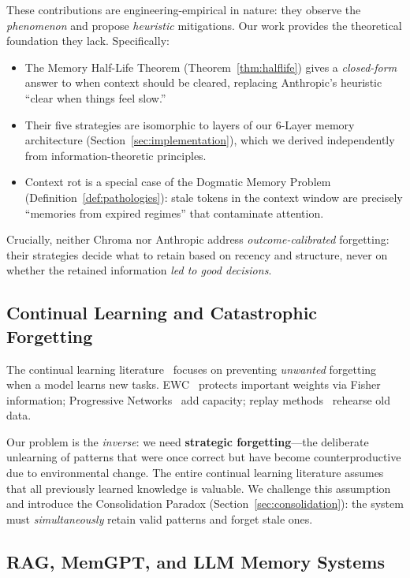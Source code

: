 \documentclass[11pt, a4paper]{article}
\begin{document}
These contributions are engineering-empirical in nature: they observe the \emph{phenomenon} and propose \emph{heuristic} mitigations. Our work provides the theoretical foundation they lack. Specifically:
\begin{itemize}[leftmargin=*]
  \item The Memory Half-Life Theorem (Theorem~\ref{thm:halflife}) gives a \emph{closed-form} answer to when context should be cleared, replacing Anthropic's heuristic ``clear when things feel slow.''
  \item Their five strategies are isomorphic to layers of our 6-Layer memory architecture (Section~\ref{sec:implementation}), which we derived independently from information-theoretic principles.
  \item Context rot is a special case of the Dogmatic Memory Problem (Definition~\ref{def:pathologies}): stale tokens in the context window are precisely ``memories from expired regimes'' that contaminate attention.
\end{itemize}

Crucially, neither Chroma nor Anthropic address \emph{outcome-calibrated} forgetting: their strategies decide what to retain based on recency and structure, never on whether the retained information \emph{led to good decisions}.

\subsection{Continual Learning and Catastrophic Forgetting}

The continual learning literature~\cite{kirkpatrick2017ewc, zenke2017continual, li2017lwf} focuses on preventing \emph{unwanted} forgetting when a model learns new tasks. EWC~\cite{kirkpatrick2017ewc} protects important weights via Fisher information; Progressive Networks~\cite{rusu2016progressive} add capacity; replay methods~\cite{shin2017continual} rehearse old data.

Our problem is the \emph{inverse}: we need \textbf{strategic forgetting}---the deliberate unlearning of patterns that were once correct but have become counterproductive due to environmental change. The entire continual learning literature assumes that all previously learned knowledge is valuable. We challenge this assumption and introduce the Consolidation Paradox (Section~\ref{sec:consolidation}): the system must \emph{simultaneously} retain valid patterns and forget stale ones.

\subsection{RAG, MemGPT, and LLM Memory Systems}
\end{document}
